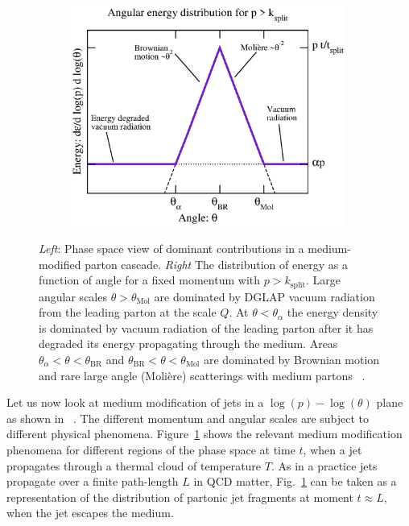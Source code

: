 \begin{figure}[tbp]
\begin{subfigure}{0.45\textwidth}
\end{subfigure}
\begin{subfigure}{0.45\textwidth}
\includegraphics[width=0.99\textwidth]{figures/e-vs-th3.eps}
\end{subfigure}
\caption{{\it Left}: Phase space view of dominant contributions in a medium-modified parton cascade. {\it Right} The distribution of energy as a function of angle for a fixed momentum with $p > k_\mathrm{split}$. Large angular scales $\theta > \theta_\mathrm{Mol}$ are dominated by DGLAP vacuum radiation from the leading parton at the scale $Q$. At $\theta < \theta_\alpha$ the energy density is dominated by vacuum radiation of the leading parton after it has degraded its energy propagating through the medium. Areas $\theta_\alpha < \theta < \theta_\mathrm{BR}$ and $\theta_\mathrm{BR} < \theta < \theta_\mathrm{Mol}$ are dominated by Brownian motion and rare large angle (Moli\`ere) scatterings with medium partons ~\cite{Kurkela:2014tla}.}
\label{fig:cascades}
\end{figure}

Let us now look at medium modification of jets in a $\log\left(p\right)-\log\left(\theta\right)$ plane as shown in ~\cite{Kurkela:2014tla}. The different momentum and angular scales are subject to different physical phenomena. Figure~\ref{fig:cascades} shows the relevant medium modification phenomena for different regions of the phase space at time $t$, when a jet propagates through a thermal cloud of temperature $T$. As in a practice jets propagate over a finite path-length $L$ in QCD matter, Fig.~\ref{fig:cascades} can be taken as a representation of the distribution of partonic jet fragments at moment $t \approx L$, when the jet escapes the medium.~\cite{Kurkela:2014tla}

